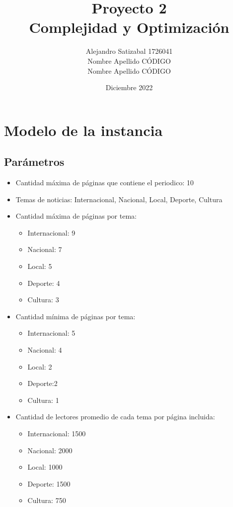 \documentclass{article}
\title{Proyecto 2 \\ Complejidad y Optimización}
\author{Alejandro Satizabal 1726041 \\ Nombre Apellido CÓDIGO \\ Nombre Apellido CÓDIGO}
\date{Diciembre 2022}
\begin{document}
\maketitle

\section{Modelo de la instancia}
\subsection{Parámetros}

\begin{itemize}
    \item Cantidad máxima de páginas que contiene el periodico: 10
    \item Temas de noticias:  Internacional, Nacional, Local, Deporte, Cultura
    \item Cantidad máxima de páginas por tema:
    \begin{itemize}
        \item Internacional: 9
        \item Nacional: 7
        \item Local: 5
        \item Deporte: 4
        \item Cultura: 3
    \end{itemize}
    \item Cantidad mínima de páginas por tema:
    \begin{itemize}
        \item Internacional: 5
        \item Nacional: 4
        \item Local: 2
        \item Deporte:2 
        \item Cultura: 1
    \end{itemize}
    \item Cantidad de lectores promedio de cada tema por página incluida:
    \begin{itemize}
        \item Internacional: 1500
        \item Nacional: 2000
        \item Local: 1000
        \item Deporte: 1500
        \item Cultura: 750
    \end{itemize}
\end{itemize}
\end{document}
